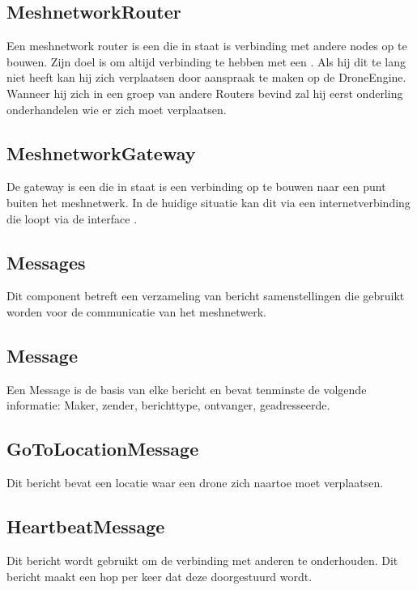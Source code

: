 \documentclass[a4paper, 11pt, oneside]{report}
\begin{document}
\subsection{MeshnetworkRouter}
\label{architectural:subcomponenten:MeshnetworkRouter}
Een meshnetwork router is een  die in staat is verbinding met andere nodes op te bouwen.
Zijn doel is om altijd verbinding te hebben met een .
Als hij dit te lang niet heeft kan hij zich verplaatsen door aanspraak te maken op de DroneEngine.
Wanneer hij zich in een groep van andere Routers bevind zal hij eerst onderling onderhandelen wie er zich moet verplaatsen.

\subsection{MeshnetworkGateway}
\label{architectural:subcomponenten:MeshnetworkGateway}
De gateway is een  die in staat is een verbinding op te bouwen naar een punt buiten het meshnetwerk. In de huidige situatie kan dit via een internetverbinding die loopt via de interface . 

\subsection{Messages}
\label{architectural:subcomponenten:Messages}
Dit component betreft een verzameling van bericht samenstellingen die gebruikt worden voor de communicatie van het meshnetwerk.

\subsection{Message}
\label{architectural:subcomponenten:Message}
Een Message is de basis van elke bericht en bevat tenminste de volgende informatie:  Maker, zender, berichttype, ontvanger, geadresseerde. 
\subsection{GoToLocationMessage}
\label{architectural:subcomponenten:GoToLocationMessage}
Dit bericht bevat een locatie waar een drone zich naartoe moet verplaatsen.

\subsection{HeartbeatMessage}
\label{architectural:subcomponenten:HeartbeatMessage}
Dit bericht wordt gebruikt om de verbinding met anderen te onderhouden. Dit bericht maakt een hop per keer dat deze doorgestuurd wordt.
\end{document}
